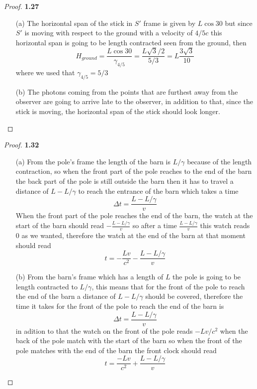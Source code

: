 \documentclass[11pt]{article}
\theoremstyle{definition}
\begin{document}
	\begin{proof}{\textbf{1.27}}
        \begin{itemize}
            \item [(a)] The horizontal span of the stick in $S'$ frame is given
            by $L\cos{30}$ but since $S'$ is moving with respect to the ground
            with a velocity of $4/5c$ this horizontal span is going to be length contracted seen from the
            ground, then
            $$H_{ground} = \frac{L \cos{30}}{\gamma_{4/5}}
                = \frac{L\sqrt{3}/2}{5/3}
                = L\frac{3\sqrt{3}}{10}$$
            where we used that $\gamma_{4/5} = 5/3$
            \item [(b)] The photons coming from the points that are furthest
            away from the observer are going to arrive late to the observer,
            in addition to that, since the stick is moving, the horizontal span
            of the stick should look longer. 
        \end{itemize}
    \end{proof}
	\begin{proof}{\textbf{1.32}}
    \begin{itemize}
        \item [(a)] From the pole's frame the length of the barn is $L/\gamma$
        because of the length contraction, so when the front part of the pole 
        reaches to the end of the barn the back part of the pole is still outside
        the barn then it has to travel a distance of $L - L/\gamma$ to reach
        the entrance of the barn which takes a time
        $$\Delta t = \frac{L - L/\gamma}{v}$$
        When the front part of the pole reaches the end of the barn,
        the watch at the start of the barn should read $-\frac{L - L/\gamma}{v}$
        so after a time $\frac{L - L/\gamma}{v}$ this watch reads $0$ as we
        wanted, therefore the watch at the end of the barn at that moment
        should read
        $$t = -\frac{Lv}{c^2} -\frac{L - L/\gamma}{v}$$

        \item [(b)] From the barn's frame which has a length of $L$ the pole is
        going to be length contracted to $L/\gamma$, this means that for the
        front of the pole to reach the end of the barn a distance of
        $L - L/\gamma$ should be covered, therefore the time it takes for the
        front of the pole to reach the end of the barn is
        $$\Delta t = \frac{L - L/\gamma}{v}$$
        in adition to that the watch on the front of the pole reads $-Lv/c^2$
        when the back of the pole match with the start of the barn so when the
        front of the pole matches with the end of the barn the front clock
        should read
        $$t = \frac{-Lv}{c^2} + \frac{L - L/\gamma}{v}$$
    \end{itemize}
    \end{proof}
\end{document}
